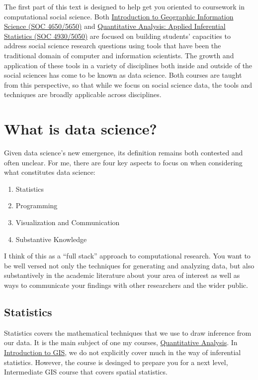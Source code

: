 \documentclass[]{book}
\providecommand{\tightlist}{%
  \setlength{\itemsep}{0pt}\setlength{\parskip}{0pt}}
\theoremstyle{definition}
\theoremstyle{definition}
\theoremstyle{definition}
\theoremstyle{remark}
\begin{document}
The first part of this text is designed to help get you oriented to
coursework in computational social science. Both
\href{https://slu-soc5650.github.io}{Introduction to Geographic
Information Science (SOC 4650/5650)} and
\href{https://slu-soc5050.github.io}{Quantitative Analysis: Applied
Inferential Statistics (SOC 4930/5050)} are focused on building
students' capacities to address social science research questions using
tools that have been the traditional domain of computer and information
scientists. The growth and application of these tools in a variety of
disciplines both inside and outside of the social sciences has come to
be known as data science. Both courses are taught from this perspective,
so that while we focus on social science data, the tools and techniques
are broadly applicable across disciplines.

\section{What is data science?}\label{what-is-data-science}

Given data science's new emergence, its definition remains both
contested and often unclear. For me, there are four key aspects to focus
on when considering what constitutes data science:

\begin{enumerate}
\def\labelenumi{\arabic{enumi}.}
\tightlist
\item
  Statistics
\item
  Programming
\item
  Visualization and Communication
\item
  Substantive Knowledge
\end{enumerate}

I think of this as a ``full stack'' approach to computational research.
You want to be well versed not only the techniques for generating and
analyzing data, but also substantively in the academic literature about
your area of interest as well as ways to communicate your findings with
other researchers and the wider public.

\subsection{Statistics}\label{statistics}

Statistics covers the mathematical techniques that we use to draw
inference from our data. It is the main subject of one my courses,
\href{https://slu-soc5050.github.io}{Quantitative Analysis}. In
\href{https://slu-soc5650.github.io}{Introduction to GIS}, we do not
explicitly cover much in the way of inferential statistics. However, the
course is desinged to prepare you for a next level, Intermediate GIS
course that covers spatial statistics.
\end{document}
